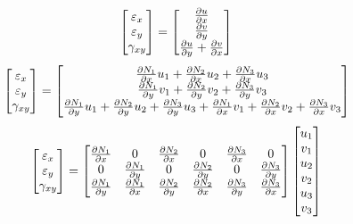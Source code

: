 %
\begin{equation}
	\begin{bmatrix}
		\varepsilon_x\\
		\varepsilon_y\\
		\gamma_{xy} 	
	\end{bmatrix} = 
	\begin{bmatrix}
		\frac{\partial u}{\partial x}\\
		\frac{\partial v}{\partial y}\\
		\frac{\partial u}{\partial y} + \frac{\partial v}{\partial x} 	
	\end{bmatrix}
\end{equation}
%
\begin{equation}
	\begin{bmatrix}
		\varepsilon_x\\
		\varepsilon_y\\
		\gamma_{xy} 	
	\end{bmatrix} = 
	\begin{bmatrix}
		\frac{\partial N_1}{\partial x} u_1+ \frac{\partial N_2}{\partial x}  u_2+ \frac{\partial N_3}{\partial x}  u_3\\
		\frac{\partial N_1}{\partial y} v_1+ \frac{\partial N_2}{\partial y}  v_2+ \frac{\partial N_3}{\partial y}  v_3\\
		\frac{\partial N_1}{\partial y} u_1+ \frac{\partial N_2}{\partial y}  u_2+ \frac{\partial N_3}{\partial y}  u_3 + \frac{\partial N_1}{\partial x} v_1+ \frac{\partial N_2}{\partial x} v_2 + \frac{\partial N_3}{\partial x} v_3 	
	\end{bmatrix}
\end{equation}
%
\begin{equation}
	\begin{bmatrix}
		\varepsilon_x\\
		\varepsilon_y\\
		\gamma_{xy} 	
	\end{bmatrix} = 
	\begin{bmatrix}
		\frac{\partial N_1}{\partial x}& 0           & \frac{\partial N_2}{\partial x} & 0           & \frac{\partial N_3}{\partial x}&           0 \\
		0           & \frac{\partial N_1}{\partial y}&            0 & \frac{\partial N_2}{\partial y}&            0& \frac{\partial N_3}{\partial y} \\
		\frac{\partial N_1}{\partial y}& \frac{\partial N_1}{\partial x}& \frac{\partial N_2}{\partial y} & \frac{\partial N_2}{\partial x}& \frac{\partial N_3}{\partial y}& \frac{\partial N_3}{\partial x} 
	\end{bmatrix}
	\begin{bmatrix}
	u_1	\\
	v_1	\\
	u_2	\\
	v_2	\\
	u_3	\\
	v_3	\\
	\end{bmatrix}
\end{equation}

